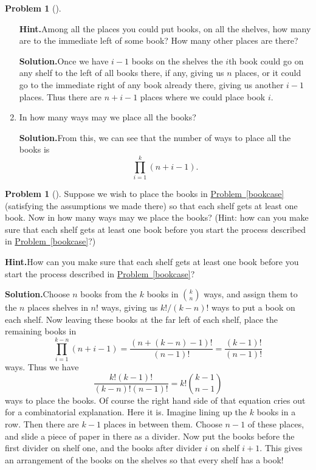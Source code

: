 \documentclass[10pt,]{book}
\theoremstyle{plain}
\theoremstyle{definition}
\newtheorem{activity}[project]{Problem}
\theoremstyle{definition}
\numberwithin{equation}{chapter}
\begin{document}
\begin{activity}[]
\begin{enumerate}[font=\bfseries,label=(\alph*),ref=\alph*]
\par\medskip\noindent%
\textbf{Hint.}\quad Among all the places you could put books, on all the shelves, how many are to the immediate left of some book? How many other places are there?%
\par\medskip\noindent%
\textbf{Solution.}\quad Once we have \(i-1\) books on the shelves the \(i\)th book could go on any shelf to the left of all books there, if any, giving us \(n\) places, or it could go to the immediate right of any book already there, giving us another \(i-1\) places. Thus there are \(n+i-1\) places where we could place book  \(i\).%
\item\label{task-103} In how many ways may we place all the books?%
\par\medskip\noindent%
\textbf{Solution.}\quad From this, we can see that the number of ways to place all the books is%
\begin{equation*}
\prod_{i=1}^k (n+i-1).
\end{equation*}
%
\end{enumerate}
\end{activity}
\begin{activity}[]\label{bookcaseeveryshelf}
Suppose we wish to place the books in \hyperref[bookcase]{Problem~\ref{bookcase}} (satisfying the assumptions we made there) so that each shelf gets at least one book. Now in how many ways may we place the books? (Hint: how can you make sure that each shelf gets at least one book before you start the process described in \hyperref[bookcase]{Problem~\ref{bookcase}}?)%
\par\medskip\noindent%
\textbf{Hint.}\quad How can you make sure that each shelf gets at least one book before you start the process described in \hyperref[bookcase]{Problem~\ref{bookcase}}?%
\par\medskip\noindent%
\textbf{Solution.}\quad Choose \(n\) books from the \(k\) books in \(\binom{k}{n}\) ways, and assign them to the \(n\) places shelves in \(n!\) ways, giving us \(k!/(k-n)!\) ways to put a book on each shelf. Now leaving these books at the far left of each shelf, place the remaining books in%
\begin{equation*}
\prod_{i=1}^{k-n}
(n+i-1)=\frac{(n+(k-n)-1)!}{(n-1)!}=\frac{(k-1)!}{(n-1)!}
\end{equation*}
ways. Thus we have%
\begin{equation*}
\frac{k!(k-1)!}{(k-n)!(n-1)!}=k!\binom{k-1}{n-1}
\end{equation*}
ways to place the books. Of course the right hand side of that equation cries out for a combinatorial explanation. Here it is. Imagine lining up the \(k\) books in a row. Then there are \(k-1\) places in between them. Choose \(n-1\) of these places, and slide a piece of paper in there as a divider. Now put the books before the first divider on shelf one, and the books after divider \(i\) on shelf \(i+1\). This gives an arrangement of the books on the shelves so that every shelf has a book!%
\end{activity}
\end{document}
